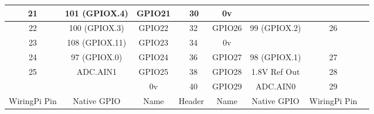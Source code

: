 \documentclass[12pt,a4paper]{article}
\begin{document}
\begin{sffamily}
\begin{center}
\begin{tabular}{|c|c|c||p{8mm}|p{8mm}||c|c|c|c|}
\hline
21	& 101 (GPIOX.4)	& \textcolor{rtb-green}{GPIO21}	& \raggedleft{29} & 30 & \textcolor{rtb-black}{0v}	&		& \\
\hline
22	& 100 (GPIOX.3)	& \textcolor{rtb-green}{GPIO22}	& \raggedleft{31} & 32 & \textcolor{rtb-green}{GPIO26}	& 99 (GPIOX.2)	& 26\\
\hline
23	& 108 (GPIOX.11)& \textcolor{rtb-green}{GPIO23}	& \raggedleft{33} & 34 & \textcolor{rtb-black}{0v}	&		& \\
\hline
24	& 97 (GPIOX.0)	& \textcolor{rtb-green}{GPIO24}	& \raggedleft{35} & 36 & \textcolor{rtb-green}{GPIO27}	& 98 (GPIOX.1)	& 27\\
\hline
25	& ADC.AIN1	& \textcolor{rtb-purple}{GPIO25}& \raggedleft{37} & 38 & \textcolor{rtb-red}{GPIO28}	& 1.8V Ref Out	& 28\\
\hline
	& 		& \textcolor{rtb-black}{0v}	& \raggedleft{39} & 40 & \textcolor{rtb-purple}{GPIO29}	& ADC.AIN0	& 29\\
\hline
\hline
WiringPi Pin	& Native GPIO	& Name	& \multicolumn{2}{|c||}{Header}	& Name	& Native GPIO	& WiringPi Pin\\
\hline
\end{tabular}
\end{center}

\end{sffamily}
\end{document}
